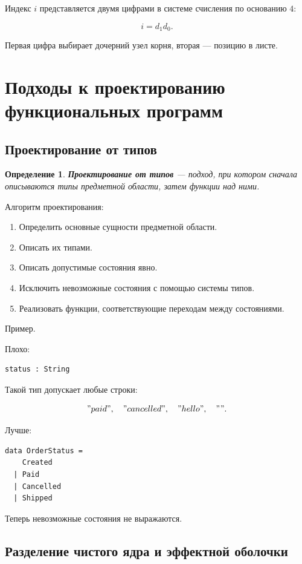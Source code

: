 \documentclass[12pt,a4paper]{article}
\newtheorem{definition}{Определение}
\begin{document}
Индекс $i$ представляется двумя цифрами в системе счисления по основанию $4$:

\[
i = d_1d_0.
\]

Первая цифра выбирает дочерний узел корня, вторая --- позицию в листе.

\section{Подходы к проектированию функциональных программ}

\subsection{Проектирование от типов}

\begin{definition}
\textbf{Проектирование от типов} --- подход, при котором сначала описываются типы предметной области, затем функции над ними.
\end{definition}

Алгоритм проектирования:

\begin{enumerate}
  \item Определить основные сущности предметной области.
  \item Описать их типами.
  \item Описать допустимые состояния явно.
  \item Исключить невозможные состояния с помощью системы типов.
  \item Реализовать функции, соответствующие переходам между состояниями.
\end{enumerate}

Пример.

Плохо:

\begin{lstlisting}
status : String
\end{lstlisting}

Такой тип допускает любые строки:

\[
"paid",\quad "cancelled",\quad "hello",\quad "".
\]

Лучше:

\begin{lstlisting}
data OrderStatus =
    Created
  | Paid
  | Cancelled
  | Shipped
\end{lstlisting}

Теперь невозможные состояния не выражаются.

\subsection{Разделение чистого ядра и эффектной оболочки}
\end{document}
